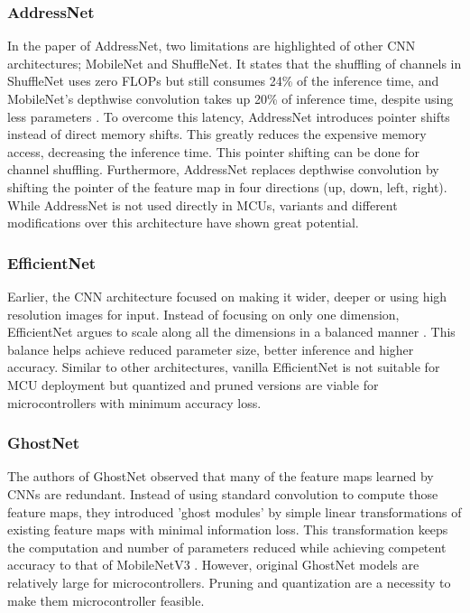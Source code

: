 \documentclass[conference]{IEEEtran}
\begin{document}
	\subsubsection{AddressNet}
	In the paper of AddressNet, two limitations are highlighted of other CNN architectures; MobileNet and ShuffleNet. It states that the shuffling of channels in ShuffleNet uses zero FLOPs but still consumes 24\% of the inference time, and MobileNet's depthwise convolution takes up 20\% of inference time, despite using less parameters \cite{addressnet2018}. To overcome this latency, AddressNet introduces pointer shifts instead of direct memory shifts. This greatly reduces the expensive memory access, decreasing the inference time. This pointer shifting can be done for channel shuffling. Furthermore, AddressNet replaces depthwise convolution by shifting the pointer of the feature map in four directions (up, down, left, right). While AddressNet is not used directly in MCUs, variants and different modifications over this architecture have shown great potential.
	
	\subsubsection{EfficientNet}
	Earlier, the CNN architecture focused on making it wider, deeper or using high resolution images for input. Instead of focusing on only one dimension, EfficientNet argues to scale along all the dimensions in a balanced manner \cite{efficientnet2019}. This balance helps achieve reduced parameter size, better inference and higher accuracy. Similar to other architectures, vanilla EfficientNet is not suitable for MCU deployment but quantized and pruned versions are viable for microcontrollers with minimum accuracy loss.
	
	\subsubsection{GhostNet}
	The authors of GhostNet observed that many of the feature maps learned by CNNs are redundant. Instead of using standard convolution to compute those feature maps, they introduced 'ghost modules' by simple linear transformations of existing feature maps with minimal information loss. This transformation keeps the computation and number of parameters reduced while achieving competent accuracy to that of MobileNetV3 \cite{ghostnet2020}. However, original GhostNet models are relatively large for microcontrollers. Pruning and quantization are a necessity to make them microcontroller feasible.
	
\end{document}
